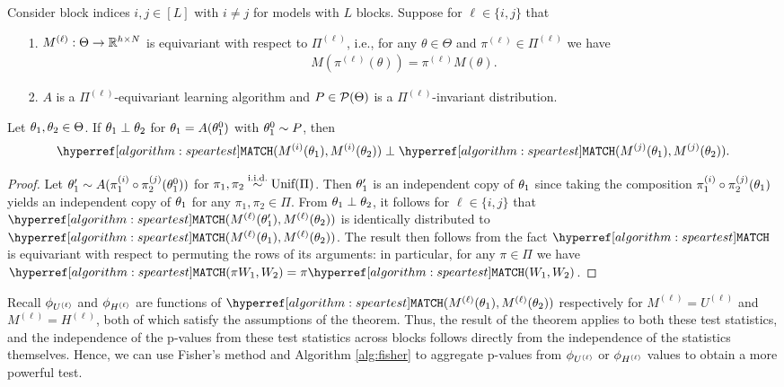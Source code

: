 {\begin{theorem}
    \label{thm:fisher}
    Consider block indices $i,j \in [L]$ with $i \neq j$ for models with $L$ blocks. Suppose for $\ell \in \{i,j\}$ that
    \begin{itemize}
        \item[1.] $M^{(\ell)} : \Theta \to \mathbb{R}^{h \times N}$ is equivariant with respect to $\Pi^{(\ell)}$, i.e.,
              for any $\theta \in \Theta$ and $\pi^{(\ell)} \in \Pi^{(\ell)}$ we have
              \begin{align*}
                  M(\pi^{(\ell)}(\theta)) = \pi^{(\ell)} M(\theta).
              \end{align*} 
        \item[2.] $A$ is a $\Pi^{(\ell)}$-equivariant learning algorithm and $P \in \mathcal{P}(\Theta)$ is a $\Pi^{(\ell)}$-invariant distribution.
    \end{itemize}
    Let $\theta_1,\theta_2 \in \Theta$. If $\theta_1 \perp \theta_2$ for $\theta_1 = A(\theta_1^0)$ with $\theta_1^0 \sim P$,
    then
    \begin{align*}
        \speartest(M^{(i)}(\firstparam),M^{(i)}(\secondparam)) \perp \speartest(M^{(j)}(\firstparam),M^{(j)}(\secondparam)).
    \end{align*}
\end{theorem}
\begin{proof}
    Let $\theta_1' \sim A(\pi_1^{(i)} \circ \pi_2^{(j)} (\theta_1^0))$ for $\pi_1,\pi_2 \overset{\text{i.i.d.}}{\sim} \textup{Unif}(\Pi)$. Then
    $\theta_1'$ is an independent copy of $\theta_1$ since taking the composition $\pi_1^{(i)} \circ \pi_2^{(j)} (\theta_1)$
    yields an independent copy of $\theta_1$ for any $\pi_1,\pi_2 \in \Pi$.
    From $\theta_1 \perp \theta_2$, it follows for $\ell \in \{i,j\}$
    that $\speartest(M^{(\ell)}(\firstparam'),M^{(\ell)}(\secondparam))$ is identically distributed to
    $\speartest(M^{(\ell)}(\firstparam),M^{(\ell)}(\secondparam))$.
    The result then follows from the fact $\speartest$ is equivariant with respect to permuting the rows of its arguments: in particular,
    for any $\pi \in \Pi$ we have $\speartest(\pi \firstM,\secondM) = \pi \speartest(\firstM,\secondM)$.
\end{proof}


Recall $\phi_{U^{(\ell)}}$ and $\phi_{H^{(\ell)}}$ are functions of $\speartest(M^{(\ell)}(\firstparam),M^{(\ell)}(\secondparam))$ respectively for
$M^{(\ell)} = U^{(\ell)}$ and $M^{(\ell)} = H^{(\ell)}$, both of which satisfy the assumptions of the theorem.
Thus, the result of the theorem applies to both these test statistics, and the independence of the p-values from these test statistics across blocks follows directly from the independence of the statistics themselves. Hence, we can use Fisher's method and Algorithm \ref{alg:fisher} to aggregate p-values from $\phi_{U^{(\ell)}}$ or $\phi_{H^{(\ell)}}$ values to obtain a more powerful test. 

}
